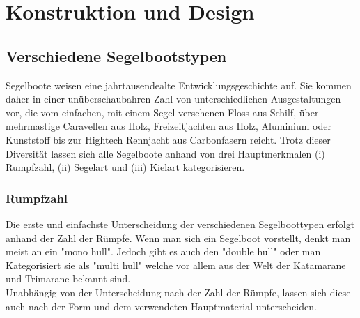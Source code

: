 


\label{chap:konstruktion}
\chapter{Konstruktion und Design}
\section{Verschiedene Segelbootstypen}
Segelboote weisen eine jahrtausendealte Entwicklungsgeschichte auf. Sie kommen daher in einer unüberschaubahren Zahl von unterschiedlichen Ausgestaltungen vor, die vom einfachen, mit einem Segel versehenen Floss aus Schilf, über mehrmastige Caravellen aus Holz, Freizeitjachten aus Holz, Aluminium oder Kunststoff  bis zur Hightech Rennjacht aus Carbonfasern reicht. Trotz dieser Diversität lassen sich alle Segelboote anhand von drei Hauptmerkmalen (i) Rumpfzahl, (ii) Segelart und (iii) Kielart kategorisieren.\\
\subsection{Rumpfzahl}
Die erste und einfachste Unterscheidung der verschiedenen Segelboottypen erfolgt anhand der Zahl der Rümpfe. Wenn man sich ein Segelboot vorstellt, denkt man meist an ein "mono hull". Jedoch gibt es auch den "double hull" oder man Kategorisiert sie als "multi hull" welche vor allem aus der Welt der Katamarane und Trimarane bekannt sind.\\
Unabhängig von der Unterscheidung nach der Zahl der Rümpfe, lassen sich diese auch nach der Form und dem verwendeten Hauptmaterial unterscheiden.
